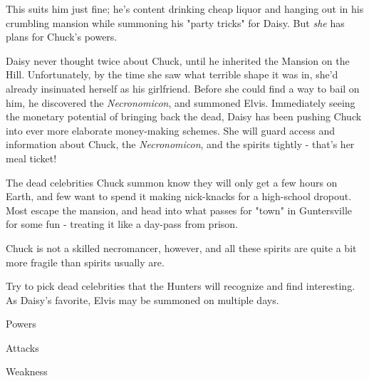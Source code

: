 \documentclass{motw}
\begin{document}
This suits him just fine; he's content drinking cheap liquor and hanging out in his crumbling mansion while summoning his "party tricks" for Daisy.  But \emph{she} has plans for Chuck's powers.


Daisy never thought twice about Chuck, until he inherited the Mansion on the Hill.  Unfortunately, by the time she saw what terrible shape it was in, she'd already insinuated herself as his girlfriend.  Before she could find a way to bail on him, he discovered the \emph{Necronomicon}, and summoned Elvis.  Immediately seeing the monetary potential of bringing back the dead, Daisy has been pushing Chuck into ever more elaborate money-making schemes.  She will guard access and information about Chuck, the \emph{Necronomicon}, and the spirits tightly - that's her meal ticket!


The dead celebrities Chuck summon know they will only get a few hours on Earth, and few want to spend it making nick-knacks for a high-school dropout.  Most escape the mansion, and head into what passes for "town" in Guntersville for some fun - treating it like a day-pass from prison.

Chuck is not a skilled necromancer, however, and all these spirits are quite a bit more fragile than spirits usually are.

Try to pick dead celebrities that the Hunters will recognize and find interesting.  As Daisy's favorite, Elvis may be summoned on multiple days.

\begin{mStatBlock}{Powers}
\end{mStatBlock}

\begin{mStatList}{Attacks}%
\end{mStatList}%
%
\begin{mStatList}{Weakness}%
\end{mStatList}%
\end{document}
